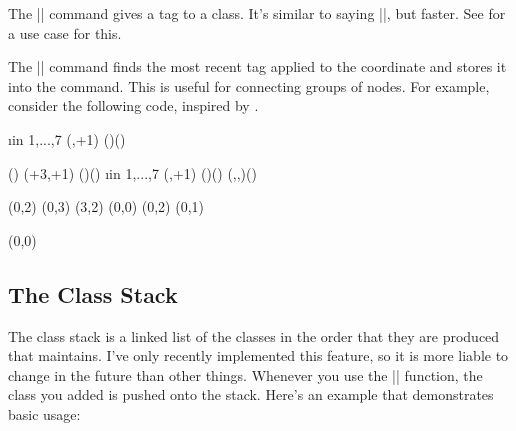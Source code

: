 \begin{sseqdata}[|| name = ex1, cohomological Serre grading]
\begin{command}{\tagclass{}}
The |\tagclass| command gives a tag to a class. It's similar to saying |\doptions[tag = |\meta{name}|]|, but faster. See  for a use case for this.
\end{command}

\begin{command}{\gettag{}}
The |\gettag| command finds the most recent tag applied to the coordinate and stores it into the command. This is useful for connecting groups of nodes. For example, consider the following code, inspired by .
\begin{codeexample}[width=6cm]
\DeclareSseqCommand {} {
    \begin{scope}[#1]
    \foreach\i in {1,...,7}{
        \class(\lastx,\lasty+1)
        \structline()(\lastclass)
    }
    \end{scope}
    \restorestack
}
\DeclareSseqCommand {} {
    \begin{scope}[#1]
    \gettag\thetag(\lastclass)
    \class(\lastx+3,\lasty+1)
    \structline[gray](\lastclass)()
    \savestack
    \foreach\i in {1,...,7}{
        \class(\lastx,\lasty+1)
        \structline()(\lastclass)
        \structline[gray](,,\thetag)(\lastclass)
    }
    \restorestack
    \end{scope}
}
\begin{sseqpage}[ y range = {0}{6}, x tick step = 3,
    xscale=0.6, yscale=1.3 ]
\class(0,2) \class(0,3) \class(3,2)
\class[tag=h_0^i](0,0)
\tower[tag=h_0^i]
\class(0,2) \class(0,1)

\htwotower[tag=h_2 h_0^i](0,0)
\htwotower[tag=h_2 h_0^i]
\end{sseqpage}
\end{codeexample}
\end{command}


\subsection{The Class Stack}
\label{sec:class stack}
The class stack is a linked list of the classes in the order that they are produced that \sseqpages\space maintains. I've only recently implemented this feature, so it is more liable to change in the future than other things. Whenever you use the |\class| function, the class you added is pushed onto the stack. Here's an example that demonstrates basic usage:



\end{sseqdata}
